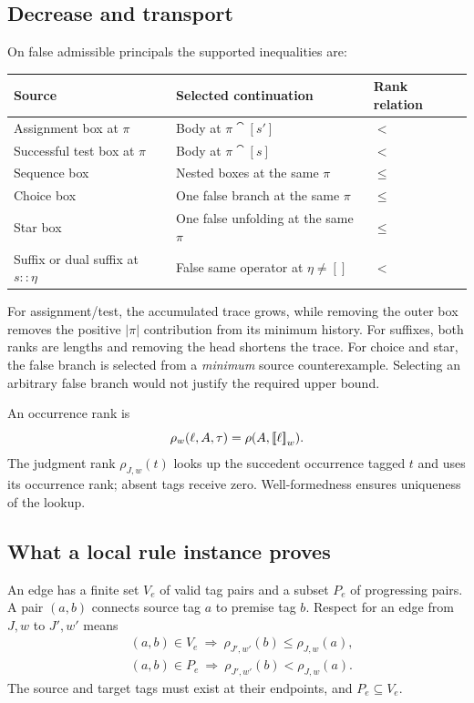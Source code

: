 \subsection{Decrease and transport}
On false admissible principals the supported inequalities are:
\begin{center}
\begin{tabular}{@{}lll@{}}
\toprule
Source & Selected continuation & Rank relation\\
\midrule
Assignment box at $\pi$ & Body at $\pi\cat[s']$ & $<$\\
Successful test box at $\pi$ & Body at $\pi\cat[s]$ & $<$\\
Sequence box & Nested boxes at the same $\pi$ & $\le$\\
Choice box & One false branch at the same $\pi$ & $\le$\\
Star box & One false unfolding at the same $\pi$ & $\le$\\
Suffix or dual suffix at $s::\eta$ & False same operator at $\eta\ne[]$ & $<$\\
\bottomrule
\end{tabular}
\end{center}

For assignment/test, the accumulated trace grows, while removing the outer
box removes the positive $|\pi|$ contribution from its minimum history.
For suffixes, both ranks are lengths and removing the head shortens the trace.
For choice and star, the false branch is selected from a \emph{minimum}
source counterexample. Selecting an arbitrary false branch would not justify
the required upper bound.

An occurrence rank is
\[
 \rho_w(\ell,A,\tau)=\rho(A,\mathopen{[\![}\ell\mathclose{]\!]}_{w}).
\]
The judgment rank $\rho_{J,w}(t)$ looks up the succedent occurrence tagged
$t$ and uses its occurrence rank; absent tags receive zero. Well-formedness
ensures uniqueness of the lookup.

\subsection{What a local rule instance proves}
An edge has a finite set $V_e$ of valid tag pairs and a subset $P_e$ of
progressing pairs. A pair $(a,b)$ connects source tag $a$ to premise tag $b$.
Respect for an edge from $J,w$ to $J',w'$ means
\begin{align*}
 &(a,b)\in V_e\ \Longrightarrow\ \rho_{J',w'}(b)\le\rho_{J,w}(a),\\
 &(a,b)\in P_e\ \Longrightarrow\ \rho_{J',w'}(b)<\rho_{J,w}(a).
\end{align*}
The source and target tags must exist at their endpoints, and $P_e\subseteq V_e$.

